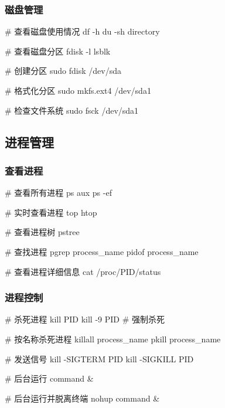 \subsubsection{磁盘管理}


\begin{lstcode}[numbers=none]
  # 查看磁盘使用情况
  df -h
  du -sh directory

  # 查看磁盘分区
  fdisk -l
  lsblk

  # 创建分区
  sudo fdisk /dev/sda

  # 格式化分区
  sudo mkfs.ext4 /dev/sda1

  # 检查文件系统
  sudo fsck /dev/sda1
\end{lstcode}

\subsection{进程管理}

\subsubsection{查看进程}


\begin{lstcode}[numbers=none]
  # 查看所有进程
  ps aux
  ps -ef

  # 实时查看进程
  top
  htop

  # 查看进程树
  pstree

  # 查找进程
  pgrep process_name
  pidof process_name

  # 查看进程详细信息
  cat /proc/PID/status
\end{lstcode}

\subsubsection{进程控制}


\begin{lstcode}[numbers=none]
  # 杀死进程
  kill PID
  kill -9 PID  # 强制杀死

  # 按名称杀死进程
  killall process_name
  pkill process_name

  # 发送信号
  kill -SIGTERM PID
  kill -SIGKILL PID

  # 后台运行
  command &

  # 后台运行并脱离终端
  nohup command &
\end{lstcode}

